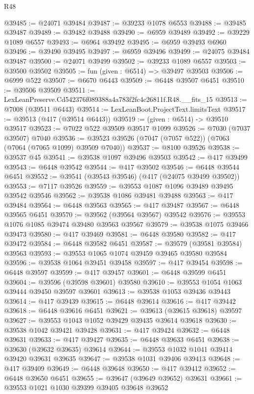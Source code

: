 \begin{lexlean}{R48}
\begin{coremodule}
@39485 := @24071 @39484
@39487 := @39233 @1078 @6553
@39488 := @39485 @39487
@39489 := @39482 @39488
@39490 := @6959 @39489
@39492 := @39229 @1089 @6557
@39493 := @6964 @39492
@39495 := @6959 @39493 @6960
@39496 := @39490 @39495
@39497 := @6959 @39496
@39499 := @24075 @39484 @39487
@39500 := @24071 @39499
@39502 := @39233 @1089 @6557
@39503 := @39500 @39502
@39505 := fun (given : @6514) => @39497 @39503
@39506 := @6999 @522
@39507 := @6670 @6443
@39509 := @6448 @39507 @6451
@39510 := @39506 @39509
@39511 := LexLeanPreserve.Cd542376f089388a4a783f2fc4c26811f.R48.__fits_15
@39513 := @7008 (@39511 @6443)
@39514 := LexLeanBoot.ProjectText.limitsText
@39517 := @39513 (@417 (@39514 @6443))
@39519 := (given : @6514) -> @39510 @39517
@39523 := @7022 @522 @39509 @39517 @1099
@39526 := @7030 (@7037 @39507) @7040
@39536 := @39523 @39526 (@7047 (@7057 @522)) (@7063 (@7064 (@7065 @1099) @39509 @7040))
@39537 := @8100 @39526
@39538 := @39537 @45
@39541 := @39538 @1097 @39496 @39503
@39542 := @417 @39499
@39543 := @6448 @39542
@39544 := @417 @39502
@39546 := @6448 @39544 @6451
@39552 := @39541 (@39543 @39546) (@417 (@24075 @39499 @39502))
@39553 := @7117 @39526
@39559 := @39553 @1087 @1096 @39489 @39495 @39542 @39546
@39562 := @39538 @1086 @39481 @39488
@39563 := @417 @39484
@39564 := @6448 @39563
@39565 := @417 @39487
@39567 := @6448 @39565 @6451
@39570 := @39562 (@39564 @39567) @39542
@39576 := @39553 @1076 @1085 @39474 @39480 @39563 @39567
@39579 := @39538 @1075 @39466 @39473
@39580 := @417 @39469
@39581 := @6448 @39580
@39582 := @417 @39472
@39584 := @6448 @39582 @6451
@39587 := @39579 (@39581 @39584) @39563
@39593 := @39553 @1065 @1074 @39459 @39465 @39580 @39584
@39596 := @39538 @1064 @39451 @39458
@39597 := @417 @39454
@39598 := @6448 @39597
@39599 := @417 @39457
@39601 := @6448 @39599 @6451
@39604 := @39596 (@39598 @39601) @39580
@39610 := @39553 @1054 @1063 @39444 @39450 @39597 @39601
@39613 := @39538 @1053 @39436 @39443
@39614 := @417 @39439
@39615 := @6448 @39614
@39616 := @417 @39442
@39618 := @6448 @39616 @6451
@39621 := @39613 (@39615 @39618) @39597
@39627 := @39553 @1043 @1052 @39429 @39435 @39614 @39618
@39630 := @39538 @1042 @39421 @39428
@39631 := @417 @39424
@39632 := @6448 @39631
@39633 := @417 @39427
@39635 := @6448 @39633 @6451
@39638 := @39630 (@39632 @39635) @39614
@39644 := @39553 @1032 @1041 @39414 @39420 @39631 @39635
@39647 := @39538 @1031 @39406 @39413
@39648 := @417 @39409
@39649 := @6448 @39648
@39650 := @417 @39412
@39652 := @6448 @39650 @6451
@39655 := @39647 (@39649 @39652) @39631
@39661 := @39553 @1021 @1030 @39399 @39405 @39648 @39652

\end{coremodule}
\end{lexlean}
